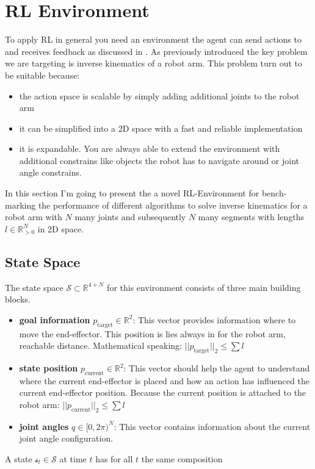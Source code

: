 \section{RL Environment}

To apply RL in general you need an environment the agent can send actions to and receives feedback as discussed in . As previously introduced the key problem we are targeting is inverse kinematics of a robot arm. This problem turn out to be suitable because:
\begin{itemize}
    \item the action space is scalable by simply adding additional joints to the robot arm
    \item it can be simplified into a 2D space with a fast and reliable implementation
    \item it is expandable. You are always able to extend the environment with additional constrains like objects the robot has to navigate around or joint angle constrains.
\end{itemize}

In this section I'm going to present the a novel RL-Environment for bench-marking the performance of different algorithms to solve inverse kinematics for a robot arm with $N$ many joints and subsequently $N$ many segments with lengths $l \in\mathbb{R}_{>0}^N$ in 2D space.  

\subsection{State Space}

The state space $\mathcal{S} \subset \mathbb{R}^{4 + N}$ for this environment consists of three main building blocks. 

\begin{itemize}
    \item \textbf{goal information} $p_\text{target} \in \mathbb{R}^2$: This vector provides information where to move the end-effector. This position is lies always in for the robot arm, reachable distance. Mathematical speaking: $||p_\text{target}||_2 \leq \sum l$ 
    \item \textbf{state position} $p_\text{current} \in \mathbb{R}^2$: This vector should help the agent to understand where the current end-effector is placed and how an action has influenced the current end-effector position. Because the current position is attached to the robot arm: $||p_\text{current}||_2 \leq \sum l$
    \item \textbf{joint angles} $q \in [0, 2\pi)^N$: This vector contains information about the current joint angle configuration.
\end{itemize}
A state $\mathcal{s}_t \in \mathcal{S}$ at time $t$ has for all $t$ the same composition

